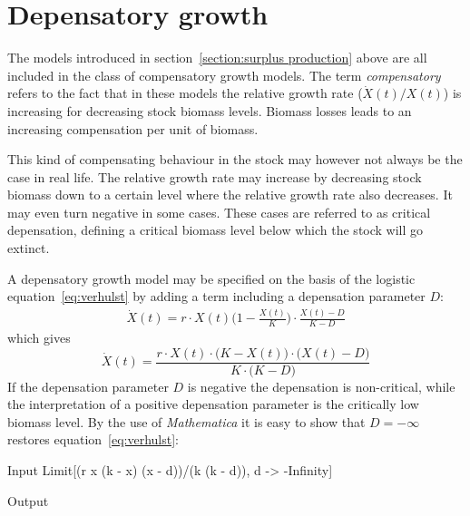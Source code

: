 \documentclass[11pt,fleqn]{book} %
\begin{document}
\section{Depensatory growth}\label{section:depensatory growth}

The models introduced in section~\ref{section:surplus production} above are all included in the class of compensatory growth models. The term \textit{compensatory} refers to the fact that in these models the relative growth rate ($\dot{X}(t)/X(t)$) is increasing for decreasing stock biomass levels. Biomass losses leads to an increasing compensation per unit of biomass.

This kind of compensating behaviour in the stock may however not always be the case in real life. The relative growth rate may increase by decreasing stock biomass down to a certain level where the relative growth rate also decreases. It may even turn negative in some cases. These cases are referred to as critical depensation, defining a critical biomass level below which the stock will go extinct.

A depensatory growth model may be specified on the basis of the logistic equation~\ref{eq:verhulst} by adding a term including a depensation parameter $D$:
\begin{align*}
\dot{X}(t) = r \cdot X(t)  \Big(1 - \frac{X(t)}{K}\Big) \cdot \frac{X(t) - D}{K - D}
\end{align*}
which gives
\begin{equation} 
\label{eq:depensationverhulst}
\dot{X}(t) = \frac{r \cdot X(t) \cdot \big(K-X(t)\big) \cdot \big(X(t)-D\big) }{K \cdot \big(K-D\big)}
\end{equation}
If the depensation parameter $D$ is negative the depensation is non-critical, while the interpretation of a positive depensation parameter is the critically low biomass level. By the use of \textit{Mathematica} it is easy to show that $D = -\infty$ restores equation~\ref{eq:verhulst}:
\begin{mmaCell}[index=1]{Input}
  Limit[(r x (k - x) (x - d))/(k (k - d)), d -> -Infinity]
\end{mmaCell}
\begin{mmaCell}{Output}
\end{mmaCell}
\end{document}
